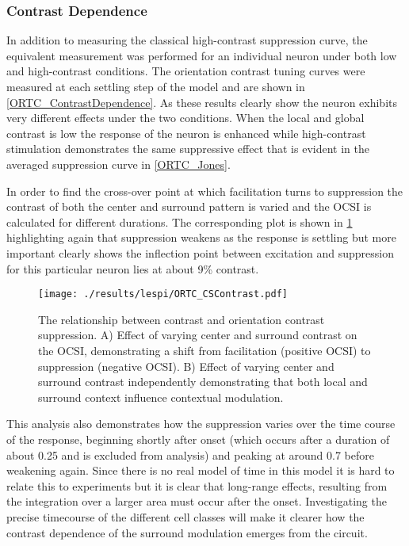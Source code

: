 \subsubsection{Contrast Dependence}

In addition to measuring the classical high-contrast suppression
curve, the equivalent measurement was performed for an individual
neuron under both low and high-contrast conditions. The orientation
contrast tuning curves were measured at each settling step of the
model and are shown in \ref{ORTC_ContrastDependence}. As these results
clearly show the neuron exhibits very different effects under the two
conditions. When the local and global contrast is low the response of
the neuron is enhanced while high-contrast stimulation demonstrates
the same suppressive effect that is evident in the averaged
suppression curve in \ref{ORTC_Jones}.

In order to find the cross-over point at which facilitation turns to
suppression the contrast of both the center and surround pattern is
varied and the OCSI is calculated for different durations. The
corresponding plot is shown in \ref{ORTC_ContrastCurve} highlighting
again that suppression weakens as the response is settling but more
important clearly shows the inflection point between excitation and
suppression for this particular neuron lies at about 9\% contrast.

\begin{figure}
	\centering
        \texttt{[image: ./results/lespi/ORTC\_CSContrast.pdf]}
	\caption[Contrast dependent switch from facilitation to
      suppression.]{The relationship between contrast and orientation
      contrast suppression. A) Effect of varying center and surround
      contrast on the OCSI, demonstrating a shift from facilitation
      (positive OCSI) to suppression (negative OCSI). B) Effect of
      varying center and surround contrast independently demonstrating
      that both local and surround context influence contextual
      modulation.}
	\label{ORTC_ContrastCurve}
\end{figure}

This analysis also demonstrates how the suppression varies over the
time course of the response, beginning shortly after onset (which
occurs after a duration of about 0.25 and is excluded from analysis)
and peaking at around 0.7 before weakening again. Since there is no
real model of time in this model it is hard to relate this to
experiments but it is clear that long-range effects, resulting from
the integration over a larger area must occur after the
onset. Investigating the precise timecourse of the different cell
classes will make it clearer how the contrast dependence of the
surround modulation emerges from the circuit.

